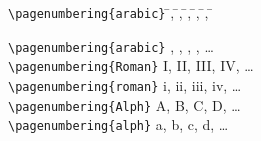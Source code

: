 
\negAbstand

\begin{tabbing}
\lstinline|\pagenumbering{arabic}| 
\hspace{0.7ex}	\=  
\hspace{1em}, \= \hspace{1em}, \= \hspace{1em}, \= \hspace{1em}, \= \hspace{1em}, \=\hspace{1em} \kill

\lstinline|\pagenumbering{arabic}|	, , , , \> \dots 
\\
\lstinline|\pagenumbering{Roman}|		\> I, \> II, \> III, \> IV,  \> \dots
\\
\lstinline|\pagenumbering{roman}|		\> i, \> ii, \> iii, \> iv,  \> \dots 
\\
\lstinline|\pagenumbering{Alph}| 		\> A, \> B, \> C, \> D,  \> \dots
\\
\lstinline|\pagenumbering{alph}|		\> a, \> b, \> c, \> d,  \> \dots 
\end{tabbing}